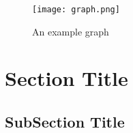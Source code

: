 \lipsum[1-5]

\begin{figure}[h]
\centering
\texttt{[image: graph.png]}
\caption{An example graph}
\label{fig:graph}
\end{figure}

\section{Section Title}

\lipsum[1-2]

\subsection{SubSection Title}

\lipsum[3]
